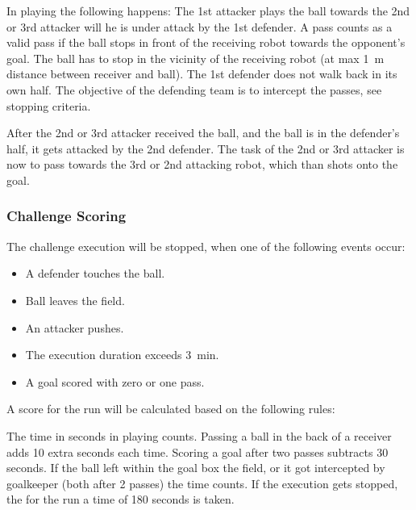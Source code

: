     In playing the following happens: The 1st attacker plays the ball towards the 2nd or 3rd attacker will he is under attack by the 1st defender. A pass counts as a valid pass if the ball stops in front of the receiving robot towards the opponent's goal. The ball has to stop in the vicinity of the receiving robot (at max \qty{1}{\metre} distance between receiver and ball). 
    The 1st defender does not walk back in its own half. The objective of the defending team is to intercept the passes, see stopping criteria.

    After the 2nd or 3rd attacker received the ball, and the ball is in the defender's half, it gets attacked by the 2nd defender. The task of the 2nd or 3rd attacker is now to pass towards the 3rd or 2nd attacking robot, which than shots onto the goal. 

    \subsubsection{Challenge Scoring}

    The challenge execution will be stopped, when one of the following events occur:

    \begin{itemize}
        \item A defender touches the ball.
        \item Ball leaves the field.
        \item An attacker pushes.
        \item The execution duration exceeds \qty{3}{\minute}.
        \item A goal scored with zero or one pass.
    \end{itemize}

    A score for the run will be calculated based on the following rules:

    The time in seconds in playing counts. Passing a ball in the back of a receiver adds 10 extra seconds each time. Scoring a goal after two passes subtracts 30 seconds.
    If the ball left within the goal box the field, or it got intercepted by goalkeeper (both after 2 passes) the time counts.
    If the execution gets stopped, the for the run a time of 180 seconds is taken.

